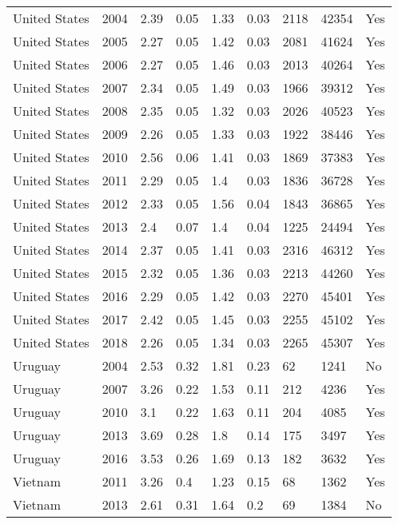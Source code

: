 \begin{tabular}{lllllllll}
United States & 2004 & 2.39 & 0.05 & 1.33 & 0.03 & 2118 & 42354 & Yes \\ 
United States & 2005 & 2.27 & 0.05 & 1.42 & 0.03 & 2081 & 41624 & Yes \\ 
United States & 2006 & 2.27 & 0.05 & 1.46 & 0.03 & 2013 & 40264 & Yes \\ 
United States & 2007 & 2.34 & 0.05 & 1.49 & 0.03 & 1966 & 39312 & Yes \\ 
United States & 2008 & 2.35 & 0.05 & 1.32 & 0.03 & 2026 & 40523 & Yes \\ 
United States & 2009 & 2.26 & 0.05 & 1.33 & 0.03 & 1922 & 38446 & Yes \\ 
United States & 2010 & 2.56 & 0.06 & 1.41 & 0.03 & 1869 & 37383 & Yes \\ 
United States & 2011 & 2.29 & 0.05 & 1.4 & 0.03 & 1836 & 36728 & Yes \\ 
United States & 2012 & 2.33 & 0.05 & 1.56 & 0.04 & 1843 & 36865 & Yes \\ 
United States & 2013 & 2.4 & 0.07 & 1.4 & 0.04 & 1225 & 24494 & Yes \\ 
United States & 2014 & 2.37 & 0.05 & 1.41 & 0.03 & 2316 & 46312 & Yes \\ 
United States & 2015 & 2.32 & 0.05 & 1.36 & 0.03 & 2213 & 44260 & Yes \\ 
United States & 2016 & 2.29 & 0.05 & 1.42 & 0.03 & 2270 & 45401 & Yes \\ 
United States & 2017 & 2.42 & 0.05 & 1.45 & 0.03 & 2255 & 45102 & Yes \\ 
United States & 2018 & 2.26 & 0.05 & 1.34 & 0.03 & 2265 & 45307 & Yes \\ 
Uruguay & 2004 & 2.53 & 0.32 & 1.81 & 0.23 & 62 & 1241 & No \\ 
Uruguay & 2007 & 3.26 & 0.22 & 1.53 & 0.11 & 212 & 4236 & Yes \\ 
Uruguay & 2010 & 3.1 & 0.22 & 1.63 & 0.11 & 204 & 4085 & Yes \\ 
Uruguay & 2013 & 3.69 & 0.28 & 1.8 & 0.14 & 175 & 3497 & Yes \\ 
Uruguay & 2016 & 3.53 & 0.26 & 1.69 & 0.13 & 182 & 3632 & Yes \\ 
Vietnam & 2011 & 3.26 & 0.4 & 1.23 & 0.15 & 68 & 1362 & Yes \\ 
Vietnam & 2013 & 2.61 & 0.31 & 1.64 & 0.2 & 69 & 1384 & No \\ 
\hline 
\end{tabular}